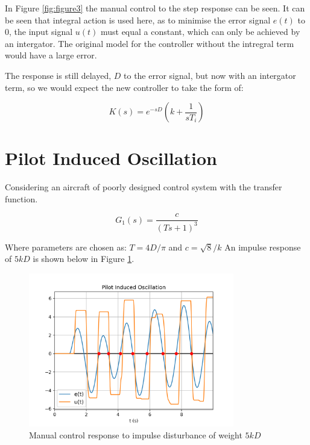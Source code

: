 \documentclass[8pt]{article}
\begin{document}
In Figure \ref{fig:figure3} the manual control to the step response can be seen. It can be seen that integral action is used here, as to minimise the error signal $e(t)$ to 0, the input signal $u(t)$ must equal a constant, which can only be achieved by an intergator.
The original model for the controller without the intregral term would have a large error.

The response is still delayed, $D$ to the error signal, but now with an intergator term, so we would expect the new controller to take the form of:

\begin{equation}
    K(s) = e^{-sD}\left( k + \frac{1}{sT_i}\right)
\end{equation}

\section{Pilot Induced Oscillation}

Considering an aircraft of poorly designed control system with the transfer function.

\begin{equation}
    G_1(s) = \frac{c}{(Ts+1)^3}
\end{equation}

Where parameters are chosen as: $T=4D/\pi$ and $c=\sqrt{8}/k$
An impulse response of $5kD$ is shown below in Figure \ref{fig:figure4}.

\begin{figure}[H]
    \centering
    \includegraphics[width=0.8\textwidth]{figures/FIGURE_4.png}
    \caption{Manual control response to impulse disturbance of weight $5kD$}
    \label{fig:figure4}
\end{figure}
\end{document}
